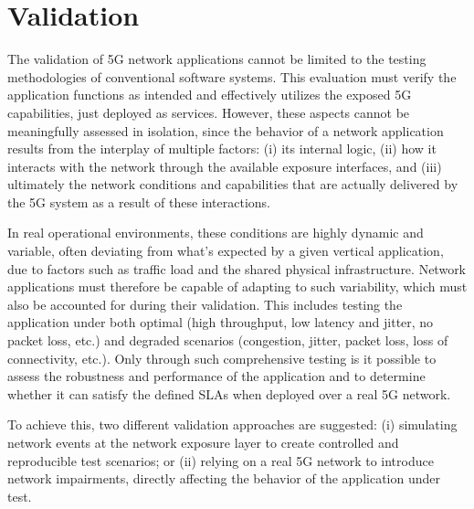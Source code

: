 \section{Validation}
\label{chap:proposal:validation}

The validation of \acs{5G} network applications cannot be limited to the testing methodologies of conventional software systems. This evaluation must verify the application functions as intended and effectively utilizes the exposed \acs{5G} capabilities, just deployed as services. However, these aspects cannot be meaningfully assessed in isolation, since the behavior of a network application results from the interplay of multiple factors: (i) its internal logic, (ii) how it interacts with the network through the available exposure interfaces, and (iii) ultimately the network conditions and capabilities that are actually delivered by the \acs{5G} system as a result of these interactions. 

In real operational environments, these conditions are highly dynamic and variable, often deviating from what's expected by a given vertical application, due to factors such as traffic load and the shared physical infrastructure. Network applications must therefore be capable of adapting to such variability, which must also be accounted for during their validation. This includes testing the application under both optimal (high throughput, low latency and jitter, no packet loss, etc.) and degraded scenarios (congestion, jitter, packet loss, loss of connectivity, etc.). Only through such comprehensive testing is it possible to assess the robustness and performance of the application and to determine whether it can satisfy the defined \acsp{SLA} when deployed over a real \acs{5G} network.

To achieve this, two different validation approaches are suggested: (i) simulating network events at the network exposure layer to create controlled and reproducible test scenarios; or (ii) relying on a real \acs{5G} network to introduce network impairments, directly affecting the behavior of the application under test.

